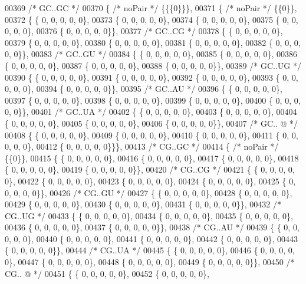 \begin{DoxyCode}
00369  \textcolor{comment}{/* GC..GC */}
00370 \{ \textcolor{comment}{/* noPair */} \{\{\{0\}\}\},
00371 \{ \textcolor{comment}{/* noPair */} \{\{0\}\},
00372 \{ \{  0, 0, 0, 0, 0\},
00373 \{  0, 0, 0, 0, 0\},
00374 \{  0, 0, 0, 0, 0\},
00375 \{  0, 0, 0, 0, 0\},
00376 \{  0, 0, 0, 0, 0\}\},
00377  \textcolor{comment}{/* GC..CG */}
00378 \{ \{  0, 0, 0, 0, 0\},
00379 \{  0, 0, 0, 0, 0\},
00380 \{  0, 0, 0, 0, 0\},
00381 \{  0, 0, 0, 0, 0\},
00382 \{  0, 0, 0, 0, 0\}\},
00383  \textcolor{comment}{/* GC..GU */}
00384 \{ \{  0, 0, 0, 0, 0\},
00385 \{  0, 0, 0, 0, 0\},
00386 \{  0, 0, 0, 0, 0\},
00387 \{  0, 0, 0, 0, 0\},
00388 \{  0, 0, 0, 0, 0\}\},
00389  \textcolor{comment}{/* GC..UG */}
00390 \{ \{  0, 0, 0, 0, 0\},
00391 \{  0, 0, 0, 0, 0\},
00392 \{  0, 0, 0, 0, 0\},
00393 \{  0, 0, 0, 0, 0\},
00394 \{  0, 0, 0, 0, 0\}\},
00395  \textcolor{comment}{/* GC..AU */}
00396 \{ \{  0, 0, 0, 0, 0\},
00397 \{  0, 0, 0, 0, 0\},
00398 \{  0, 0, 0, 0, 0\},
00399 \{  0, 0, 0, 0, 0\},
00400 \{  0, 0, 0, 0, 0\}\},
00401  \textcolor{comment}{/* GC..UA */}
00402 \{ \{  0, 0, 0, 0, 0\},
00403 \{  0, 0, 0, 0, 0\},
00404 \{  0, 0, 0, 0, 0\},
00405 \{  0, 0, 0, 0, 0\},
00406 \{  0, 0, 0, 0, 0\}\},
00407  \textcolor{comment}{/* GC.. @ */}
00408 \{ \{  0, 0, 0, 0, 0\},
00409 \{  0, 0, 0, 0, 0\},
00410 \{  0, 0, 0, 0, 0\},
00411 \{  0, 0, 0, 0, 0\},
00412 \{  0, 0, 0, 0, 0\}\}\},
00413  \textcolor{comment}{/* CG..GC */}
00414 \{ \textcolor{comment}{/* noPair */} \{\{0\}\},
00415 \{ \{  0, 0, 0, 0, 0\},
00416 \{  0, 0, 0, 0, 0\},
00417 \{  0, 0, 0, 0, 0\},
00418 \{  0, 0, 0, 0, 0\},
00419 \{  0, 0, 0, 0, 0\}\},
00420  \textcolor{comment}{/* CG..CG */}
00421 \{ \{  0, 0, 0, 0, 0\},
00422 \{  0, 0, 0, 0, 0\},
00423 \{  0, 0, 0, 0, 0\},
00424 \{  0, 0, 0, 0, 0\},
00425 \{  0, 0, 0, 0, 0\}\},
00426  \textcolor{comment}{/* CG..GU */}
00427 \{ \{  0, 0, 0, 0, 0\},
00428 \{  0, 0, 0, 0, 0\},
00429 \{  0, 0, 0, 0, 0\},
00430 \{  0, 0, 0, 0, 0\},
00431 \{  0, 0, 0, 0, 0\}\},
00432  \textcolor{comment}{/* CG..UG */}
00433 \{ \{  0, 0, 0, 0, 0\},
00434 \{  0, 0, 0, 0, 0\},
00435 \{  0, 0, 0, 0, 0\},
00436 \{  0, 0, 0, 0, 0\},
00437 \{  0, 0, 0, 0, 0\}\},
00438  \textcolor{comment}{/* CG..AU */}
00439 \{ \{  0, 0, 0, 0, 0\},
00440 \{  0, 0, 0, 0, 0\},
00441 \{  0, 0, 0, 0, 0\},
00442 \{  0, 0, 0, 0, 0\},
00443 \{  0, 0, 0, 0, 0\}\},
00444  \textcolor{comment}{/* CG..UA */}
00445 \{ \{  0, 0, 0, 0, 0\},
00446 \{  0, 0, 0, 0, 0\},
00447 \{  0, 0, 0, 0, 0\},
00448 \{  0, 0, 0, 0, 0\},
00449 \{  0, 0, 0, 0, 0\}\},
00450  \textcolor{comment}{/* CG.. @ */}
00451 \{ \{  0, 0, 0, 0, 0\},
00452 \{  0, 0, 0, 0, 0\},

\end{DoxyCode}
